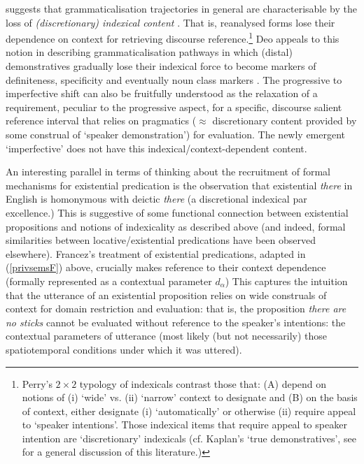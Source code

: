 \documentclass[usenames,dvipsnames,11pt]{article}
\begin{document}
{\citep{Deo2018} suggests that grammaticalisation trajectories in general are characterisable by the loss of \textit{(discretionary) indexical content} \citep[\textit{e.g.}][68\textit{ff}]{Perry2012}. That is, reanalysed forms lose their dependence on context for retrieving discourse reference.\footnote{Perry's \citeyearpar[68ff]{Perry2012} $2\times 2${} typology of indexicals contrast those that: (A) depend on notions of (i) `wide' vs. (ii) `narrow' context to designate and (B) on the basis of context, either designate (i) `automatically' or otherwise (ii) require appeal to `speaker intentions'. Those indexical items that require appeal to speaker intention are `discretionary' indexicals (cf. Kaplan's `true demonstratives', see \cite{Braun2017} for a general discussion of this literature.)} Deo appeals to this notion in describing grammaticalisation pathways in which (distal) demonstratives gradually lose their indexical force to become markers of definiteness, specificity and eventually noun class markers \citep[see also][61]{Greenberg1978,deMulder2011,Stevens2007}. The progressive to imperfective shift can also be fruitfully understood as the relaxation of a requirement, peculiar to the progressive aspect, for a specific, discourse salient reference interval that relies on pragmatics ($\approx$ discretionary content provided by some construal of `speaker demonstration') for evaluation. The newly emergent `imperfective' does not have this indexical/context-dependent content.

An interesting parallel in terms of thinking about the recruitment of formal mechanisms for existential predication is the observation that existential \textit{there} in English is homonymous with deictic \textit{there} (a discretional indexical par excellence.) This is suggestive of some functional connection between existential propositions and notions of indexicality as described above (and indeed, formal similarities between locative/existential predications have been observed elsewhere). Francez's \citeyear{Francez2007} treatment of existential predications, adapted in (\ref{privsemsF}) above, crucially makes reference to their context dependence (formally represented as a contextual parameter $d_\alpha$) This captures the intuition that the utterance of an existential proposition relies on wide construals of context for domain restriction and evaluation: that is, the proposition \textit{there are no sticks} cannot be evaluated without reference to the speaker's intentions: the contextual parameters of utterance (most likely (but not necessarily) those spatiotemporal conditions under which it was uttered). 

}
\end{document}
